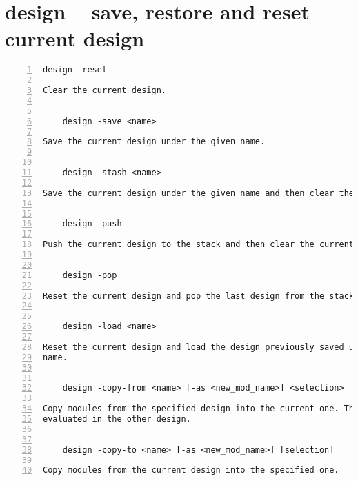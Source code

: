 \section{design -- save, restore and reset current design}
\label{cmd:design}
\begin{lstlisting}[numbers=left,frame=single]
    design -reset

Clear the current design.


    design -save <name>

Save the current design under the given name.


    design -stash <name>

Save the current design under the given name and then clear the current design.


    design -push

Push the current design to the stack and then clear the current design.


    design -pop

Reset the current design and pop the last design from the stack.


    design -load <name>

Reset the current design and load the design previously saved under the given
name.


    design -copy-from <name> [-as <new_mod_name>] <selection>

Copy modules from the specified design into the current one. The selection is
evaluated in the other design.


    design -copy-to <name> [-as <new_mod_name>] [selection]

Copy modules from the current design into the specified one.
\end{lstlisting}

